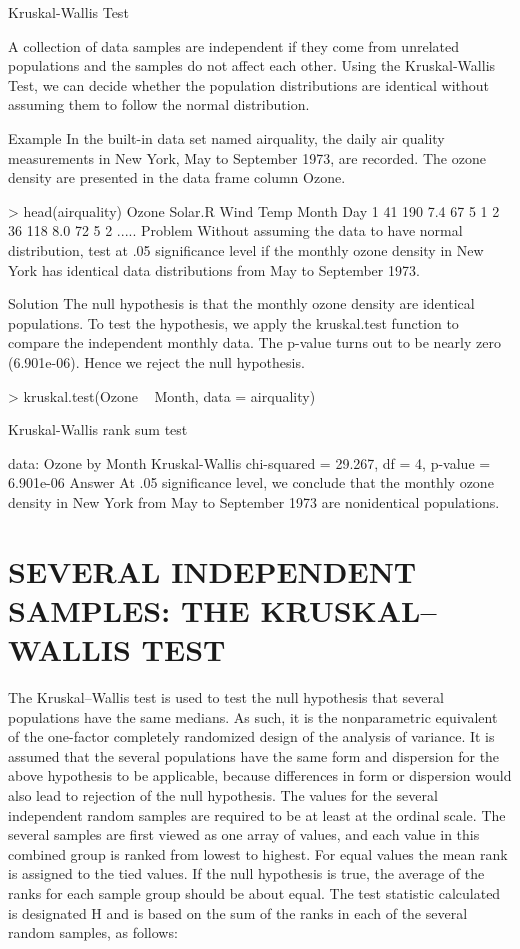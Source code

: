 Kruskal-Wallis Test

A collection of data samples are independent if they come from unrelated populations and the samples do not affect each other. Using the Kruskal-Wallis Test, we can decide whether the population distributions are identical without assuming them to follow the normal distribution.

Example
In the built-in data set named airquality, the daily air quality measurements in New York, May to September 1973, are recorded. The ozone density are presented in the data frame column Ozone.

> head(airquality) 
  Ozone Solar.R Wind Temp Month Day 
1    41     190  7.4   67     5   1 
2    36     118  8.0   72     5   2 
    .....
Problem
Without assuming the data to have normal distribution, test at .05 significance level if the monthly ozone density in New York has identical data distributions from May to September 1973.

Solution
The null hypothesis is that the monthly ozone density are identical populations. To test the hypothesis, we apply the kruskal.test function to compare the independent monthly data. The p-value turns out to be nearly zero (6.901e-06). Hence we reject the null hypothesis.

> kruskal.test(Ozone ~ Month, data = airquality) 
 
        Kruskal-Wallis rank sum test 
 
data:  Ozone by Month 
Kruskal-Wallis chi-squared = 29.267, df = 4, p-value = 6.901e-06
Answer
At .05 significance level, we conclude that the monthly ozone density in New York from May to September 1973 are nonidentical populations.


\section{SEVERAL INDEPENDENT SAMPLES: THE KRUSKAL–WALLIS TEST}

The Kruskal–Wallis test is used to test the null hypothesis that several populations have the same
medians. As such, it is the nonparametric equivalent of the one-factor completely randomized design of the
analysis of variance. It is assumed that the several populations have the same form and dispersion for the
above hypothesis to be applicable, because differences in form or dispersion would also lead to rejection of
the null hypothesis. The values for the several independent random samples are required to be at least at the
ordinal scale.
The several samples are first viewed as one array of values, and each value in this combined group is
ranked from lowest to highest. For equal values the mean rank is assigned to the tied values. If the null
hypothesis is true, the average of the ranks for each sample group should be about equal. The test statistic
calculated is designated H and is based on the sum of the ranks in each of the several random samples, as
follows:

